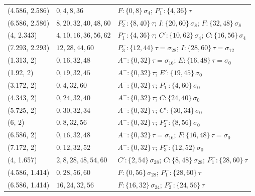 \documentclass[11pt]{article}
\theoremstyle{definition}
\theoremstyle{remark}
\begin{document}
{\begin{longtable}{lll}
(4.586, 2.586) & $0,4,8,36$ & $F\!:\{0,8\}\,\sigma_{4}$; $P_1^{-}\!:\{4,36\}\,\tau$ \\
(6.586, 2.586) & $8,20,32,40,48,60$ & $P_2^{-}\!:\{8,40\}\,\tau$; $I\!:\{20,60\}\,\sigma_{8}$; $F\!:\{32,48\}\,\sigma_{8}$ \\
(4, 2.343) & $4,10,16,36,56,62$ & $P_1^{-}\!:\{4,36\}\,\tau$; $C'\!:\{10,62\}\,\sigma_{4}$; $C\!:\{16,56\}\,\sigma_{4}$ \\
(7.293, 2.293) & $12,28,44,60$ & $P_3^{-}\!:\{12,44\}\,\tau{=}\sigma_{28}$; $I\!:\{28,60\}\,\tau{=}\sigma_{12}$ \\
(1.313, 2) & $0,16,32,48$ & $A^{-}\!:\{0,32\}\,\tau{=}\sigma_{16}$; $E\!:\{16,48\}\,\tau{=}\sigma_{0}$ \\
(1.92, 2) & $0,19,32,45$ & $A^{-}\!:\{0,32\}\,\tau$; $E'\!:\{19,45\}\,\sigma_{0}$ \\
(3.172, 2) & $0,4,32,60$ & $A^{-}\!:\{0,32\}\,\tau$; $P_1^{-}\!:\{4,60\}\,\sigma_{0}$ \\
(4.343, 2) & $0,24,32,40$ & $A^{-}\!:\{0,32\}\,\tau$; $C\!:\{24,40\}\,\sigma_{0}$ \\
(5.725, 2) & $0,30,32,34$ & $A^{-}\!:\{0,32\}\,\tau$; $C'\!:\{30,34\}\,\sigma_{0}$ \\
(6, 2) & $0,8,32,56$ & $A^{-}\!:\{0,32\}\,\tau$; $P_2^{-}\!:\{8,56\}\,\sigma_{0}$ \\
(6.586, 2) & $0,16,32,48$ & $A^{-}\!:\{0,32\}\,\tau{=}\sigma_{16}$; $F\!:\{16,48\}\,\tau{=}\sigma_{0}$ \\
(7.172, 2) & $0,12,32,52$ & $A^{-}\!:\{0,32\}\,\tau$; $P_3^{-}\!:\{12,52\}\,\sigma_{0}$ \\
(4, 1.657) & $2,8,28,48,54,60$ & $C'\!:\{2,54\}\,\sigma_{28}$; $C\!:\{8,48\}\,\sigma_{28}$; $P_1^{-}\!:\{28,60\}\,\tau$ \\
(4.586, 1.414) & $0,28,56,60$ & $F\!:\{0,56\}\,\sigma_{28}$; $P_1^{-}\!:\{28,60\}\,\tau$ \\
(6.586, 1.414) & $16,24,32,56$ & $F\!:\{16,32\}\,\sigma_{24}$; $P_2^{-}\!:\{24,56\}\,\tau$ \\
\bottomrule
\end{longtable}}
\end{document}
